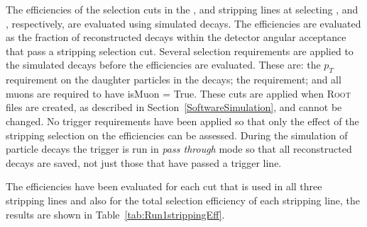 The efficiencies of the selection cuts in the \bmumu, \bhh and \bujpsik stripping lines at selecting \bmumu, \bhh and \bujpsik, respectively, are evaluated using simulated decays. 
The efficiencies are evaluated as the fraction of reconstructed decays within the detector angular acceptance that pass a stripping selection cut.
Several selection requirements are applied to the simulated decays before the efficiencies are evaluated. These are: the $p_T$ requirement on the daughter particles in the decays; the \chitrk requirement; and all muons are required to have isMuon = True. These cuts are applied when \textsc{Root} files are created, as described in Section~\ref{SoftwareSimulation}, and cannot be changed.
No trigger requirements have been applied so that only the effect of the stripping selection on the efficiencies can be assessed. During the simulation of particle decays the trigger is run in {\it pass through} mode so that all reconstructed decays are saved, not just those that have passed a trigger line.


The efficiencies have been evaluated for each cut that is used in all three stripping lines and also for the total selection efficiency of each stripping line, the results are shown in Table~\ref{tab:Run1strippingEff}.


